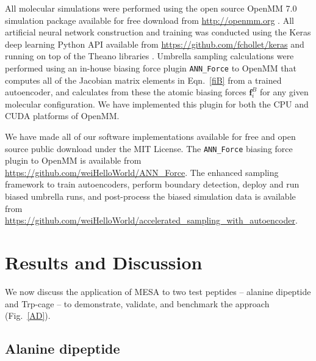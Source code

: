 \documentclass[12pt]{article}
\newcommand*{\blauw}[1]{#1}
\begin{document}
All molecular simulations were performed using the open source OpenMM 7.0 simulation package available for free download from \url{http://openmm.org} \cite{eastman2017openmm,friedrichs2009accelerating}. All artificial neural network construction and training was conducted using the Keras deep learning Python API available from \url{https://github.com/fchollet/keras} and running on top of the Theano libraries \cite{2016arXiv160502688full}.  Umbrella sampling calculations were performed using an in-house biasing force plugin \texttt{ANN\_Force} to OpenMM that computes all of the Jacobian matrix elements in \blauw{Eqn.~\ref{fiB}} from a trained autoencoder, and calculates from these the atomic biasing forces $\mathbf{f}_i^B$ for any given molecular configuration. We have implemented this plugin for both the CPU and CUDA platforms of OpenMM.

We have made all of our software implementations available for free and open source public download under the MIT License. The \texttt{ANN\_Force} biasing force plugin to OpenMM is available from \url{https://github.com/weiHelloWorld/ANN_Force}. The enhanced sampling framework to train autoencoders, perform boundary detection, deploy and run biased umbrella runs, and post-process the biased simulation data is available from \url{https://github.com/weiHelloWorld/accelerated_sampling_with_autoencoder}.





\section{\sffamily \Large Results and Discussion} \label{results_discussion_section}

We now discuss the application of MESA to two test peptides -- alanine dipeptide and Trp-cage -- to demonstrate, validate, and benchmark the approach (\blauw{Fig.~\ref{AD}}).


\subsection{\sffamily \large Alanine dipeptide}
\end{document}

